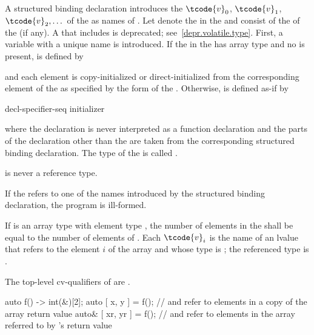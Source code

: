 \pnum
A structured binding declaration introduces the 
$\tcode{v}_0$, $\tcode{v}_1$, $\tcode{v}_2, \dotsc$
of the
 as names
of .
Let \cv{} denote the  in
the  and
 consist of the  of
the  (if any).
A \cv{} that includes  is deprecated;
see~\ref{depr.volatile.type}.
First, a variable with a unique name  is introduced. If the
 in the 
has array type  and no  is present,
 is defined by
\begin{ncbnf}
  \cv{}   \terminal{;}
\end{ncbnf}
and each element is copy-initialized or direct-initialized
from the corresponding element of the  as specified
by the form of the .
Otherwise, 
is defined as-if by
\begin{ncbnf}
 decl-specifier-seq   initializer \terminal{;}
\end{ncbnf}
where
the declaration is never interpreted as a function declaration and
the parts of the declaration other than the  are taken
from the corresponding structured binding declaration.
The type of the 
 is called .
\begin{note}
 is never a reference type.
\end{note}

\pnum
If the  refers to
one of the names introduced by the structured binding declaration,
the program is ill-formed.

\pnum
If  is an array type with element type , the number
of elements in the  shall be equal to the
number of elements of . Each $\tcode{v}_i$ is the name of an
lvalue that refers to the element $i$ of the array and whose type
is ; the referenced type is .
\begin{note}
The top-level cv-qualifiers of  are \cv.
\end{note}
\begin{example}
\begin{codeblock}
auto f() -> int(&)[2];
auto [ x, y ] = f();            //  and  refer to elements in a copy of the array return value
auto& [ xr, yr ] = f();         //  and  refer to elements in the array referred to by 's return value
\end{codeblock}
\end{example}

